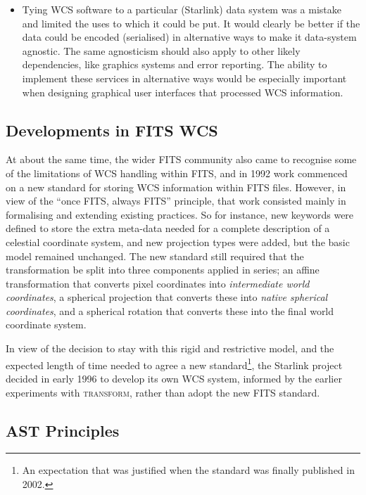 \documentclass[final,authoryear,5p,times,twocolumn]{elsarticle}
\begin{document}
\begin{itemize}
\item Tying WCS software to a particular (Starlink) data system was a
  mistake and limited the uses to which it could be put. It would
  clearly be better if the data could be encoded (serialised) in
  alternative ways to make it data-system agnostic. The same
  agnosticism should also apply to other likely dependencies, like
  graphics systems and error reporting.  The ability to implement
  these services in alternative ways would be especially important
  when designing graphical user interfaces that processed WCS
  information.

\end{itemize}

\subsection{Developments in FITS WCS}

At about the same time, the wider FITS community also came to recognise
some of the limitations of WCS handling within FITS, and in 1992 work commenced
on a new standard for storing WCS information within FITS files. However,
in view of the ``once FITS, always FITS'' principle, that work consisted
mainly in formalising and extending existing practices. So for instance, new
keywords were defined to store the extra meta-data needed for a complete
description of a celestial coordinate system, and new projection types were
added, but the basic model remained unchanged. The new standard still required
that the transformation be split into three components applied in series; an
affine transformation that converts pixel coordinates into \emph{intermediate
world coordinates}, a spherical projection that converts these into \emph{native
spherical coordinates}, and a spherical rotation that converts these into the
final world coordinate system.

In view of the decision to stay with this rigid and restrictive model,
and the expected length of time needed to agree a new standard\footnote{An
expectation that was justified when the standard was finally published in 2002.},
the Starlink project decided in early 1996 to develop its own WCS system, informed
by the earlier experiments with \textsc{transform}, rather than adopt the new FITS
standard.

\subsection{AST Principles}
\end{document}
